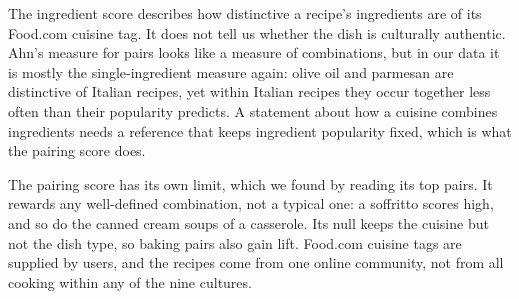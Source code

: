 The ingredient score describes how distinctive a recipe's ingredients are of its Food.com cuisine tag. It does not tell us whether the dish is culturally authentic. Ahn's measure for pairs looks like a measure of combinations, but in our data it is mostly the single-ingredient measure again: olive oil and parmesan are distinctive of Italian recipes, yet within Italian recipes they occur together less often than their popularity predicts. A statement about how a cuisine combines ingredients needs a reference that keeps ingredient popularity fixed, which is what the pairing score does.

The pairing score has its own limit, which we found by reading its top pairs. It rewards any well-defined combination, not a typical one: a soffritto scores high, and so do the canned cream soups of a casserole. Its null keeps the cuisine but not the dish type, so baking pairs also gain lift. Food.com cuisine tags are supplied by users, and the recipes come from one online community, not from all cooking within any of the nine cultures.
